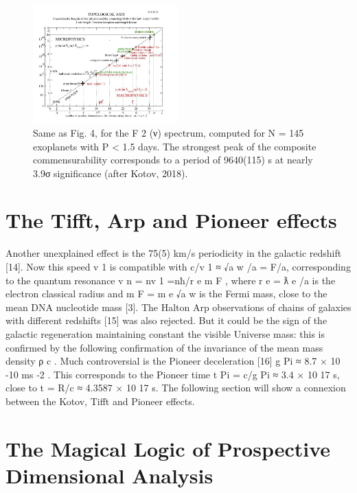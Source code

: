 \begin{figure}
\centering
\includegraphics[width=0.5\textwidth]{./figures/figure}
\caption{Same as Fig. 4, for the F 2 (ν) spectrum, computed for N = 145 exoplanets with P < 1.5
days. The strongest peak of the composite commensurability corresponds to a period of 9640(115) s
at nearly 3.9σ significance (after Kotov, 2018).}
\label{fig:figure_label}
\end{figure}


\section {The Tifft, Arp and Pioneer effects}

Another unexplained effect is the 75(5) km/s periodicity in the galactic redshift [14]. Now this
speed v 1 is compatible with c/v 1 ≈ √a w /a = F/a, corresponding to the quantum resonance v n = nv 1 =nħ/r e m F , where r e = ƛ e /a is the electron classical radius and m F = m e √a w is the Fermi mass, close to the
mean DNA nucleotide mass [3].
The Halton Arp observations of chains of galaxies with different redshifts [15] was also
rejected. But it could be the sign of the galactic regeneration maintaining constant the visible
Universe mass: this is confirmed by the following confirmation of the invariance of the mean mass
density ρ c .
Much controversial is the Pioneer deceleration [16] g Pi ≈ 8.7 × 10 -10 ms -2 . This corresponds to
the Pioneer time t Pi = c/g Pi ≈ 3.4 × 10 17 s, close to t = R/c ≈ 4.3587 × 10 17 s. The following section
will show a connexion between the Kotov, Tifft and Pioneer effects.

\section {The Magical Logic of Prospective Dimensional Analysis}

